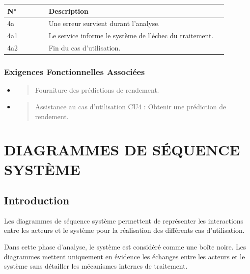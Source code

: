 \begin{longtable}{@{}p{0.18\linewidth}p{0.78\linewidth}@{}}
\toprule
\rowcolors{2}{gray!10}{white}
\textbf{N°} & \textbf{Description} \\
\midrule
\endhead
4a & Une erreur survient durant l'analyse. \\
4a1 & Le service informe le système de l'échec du traitement. \\
4a2 & Fin du cas d'utilisation. \\
\bottomrule
\end{longtable}

\hypertarget{exigences-fonctionnelles-associuxe9es-7}{%
\subsection{Exigences Fonctionnelles
Associées}\label{exigences-fonctionnelles-associuxe9es-7}}

\begin{itemize}
\item
  \begin{quote}
  Fourniture des prédictions de rendement.
  \end{quote}
\item
  \begin{quote}
  Assistance au cas d'utilisation CU4 : Obtenir une prédiction de
  rendement.
  \end{quote}
\end{itemize}

\hypertarget{chapitre-7-diagrammes-de-suxe9quence-systuxe8me}{%
\chapter{DIAGRAMMES DE SÉQUENCE
SYSTÈME}\label{chapitre-7-diagrammes-de-suxe9quence-systuxe8me}}

\hypertarget{introduction-3}{%
\section{Introduction}\label{introduction-3}}

Les diagrammes de séquence système permettent de représenter les
interactions entre les acteurs et le système pour la réalisation des
différents cas d'utilisation.

Dans cette phase d'analyse, le système est considéré comme une boîte
noire. Les diagrammes mettent uniquement en évidence les échanges entre
les acteurs et le système sans détailler les mécanismes internes de
traitement.

